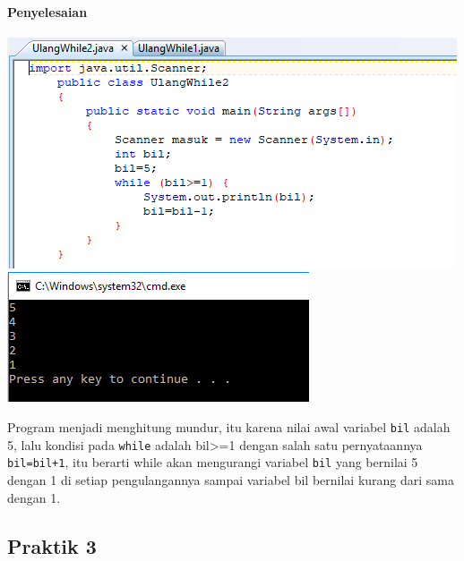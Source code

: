 \documentclass[a4paper,12pt]{article}
\begin{document}
\paragraph{Penyelesaian\\}
\begin{center}
	\includegraphics[width=\linewidth]{Capture4}
	\includegraphics[scale=1]{Capture5}
\end{center}
Program menjadi menghitung mundur, itu karena nilai awal variabel \texttt{bil} adalah 5, lalu kondisi pada \texttt{while} adalah bil>=1 dengan salah satu pernyataannya \texttt{bil=bil+1}, itu berarti while akan mengurangi variabel \texttt{bil} yang bernilai 5 dengan 1 di setiap pengulangannya sampai variabel bil bernilai kurang dari sama dengan 1. 

\subsection{Praktik 3}
\end{document}
